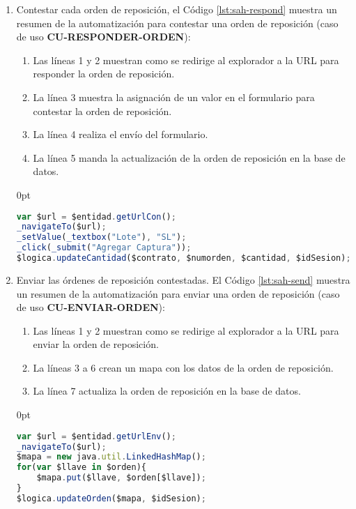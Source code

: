 \begin{enumerate}
	\item Contestar cada orden de reposición, el Código \ref{lst:sah-respond} muestra un resumen de la automatización para contestar una orden de reposición (caso de uso \textbf{CU-RESPONDER-ORDEN}):
	\begin{enumerate}
		\item Las líneas 1 y 2 muestran como se redirige al explorador a la URL para responder la orden de reposición.
		\item  La línea 3 muestra la asignación de un valor en el formulario para contestar la orden de reposición.
		\item La línea 4 realiza el envío del formulario.
		\item La línea 5 manda la actualización de la orden de reposición en la base de datos.
	\end{enumerate}
	\begin{adjustwidth}{\listingfixwidth}{0pt}
	\begin{lstlisting}[language=Javascript, caption={Responder orden de reposición.}, captionpos=b, label={lst:sah-respond}]
var $url = $entidad.getUrlCon();
_navigateTo($url);
_setValue(_textbox("Lote"), "SL");
_click(_submit("Agregar Captura"));
$logica.updateCantidad($contrato, $numorden, $cantidad, $idSesion);
	\end{lstlisting}
	\end{adjustwidth}

	\item Enviar las órdenes de reposición contestadas. El Código \ref{lst:sah-send} muestra un resumen de la automatización para enviar una orden de reposición (caso de uso \textbf{CU-ENVIAR-ORDEN}):
	\begin{enumerate}
		\item Las líneas 1 y 2 muestran como se redirige al explorador a la URL para enviar la orden de reposición.
		\item La líneas 3 a 6 crean un mapa con los datos de la orden de reposición.
		\item La línea 7 actualiza la orden de reposición en la base de datos. 
	\end{enumerate}
	\begin{adjustwidth}{\listingfixwidth}{0pt}
	\begin{lstlisting}[language=Javascript, caption={Enviar orden de reposición.}, captionpos=b, label={lst:sah-send}]
var $url = $entidad.getUrlEnv();
_navigateTo($url);
$mapa = new java.util.LinkedHashMap();
for(var $llave in $orden){
	$mapa.put($llave, $orden[$llave]);
}
$logica.updateOrden($mapa, $idSesion);
	\end{lstlisting}
	\end{adjustwidth}
\end{enumerate}

